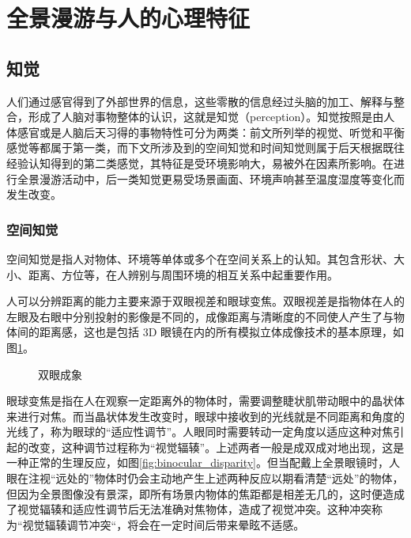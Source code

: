 \section{全景漫游与人的心理特征}

\subsection{知觉}
人们通过感官得到了外部世界的信息，这些零散的信息经过头脑的加工、解释与整合，形成了人脑对事物整体的认识，这就是知觉（perception）。知觉按照是由人体感官或是人脑后天习得的事物特性可分为两类：前文所列举的视觉、听觉和平衡感觉等都属于第一类，而下文所涉及到的空间知觉和时间知觉则属于后天根据既往经验认知得到的第二类感觉，其特征是受环境影响大，易被外在因素所影响。在进行全景漫游活动中，后一类知觉更易受场景画面、环境声响甚至温度湿度等变化而发生改变。

\subsubsection{空间知觉}
空间知觉是指人对物体、环境等单体或多个在空间关系上的认知。其包含形状、大小、距离、方位等，在人辨别与周围环境的相互关系中起重要作用。

人可以分辨距离的能力主要来源于双眼视差和眼球变焦。双眼视差是指物体在人的左眼及右眼中分别投射的影像是不同的，成像距离与清晰度的不同使人产生了与物体间的距离感，这也是包括 3D 眼镜在内的所有模拟立体成像技术的基本原理，如图\ref{fig:eyes}。

\begin{figure}[htp]
\centering
{}
\caption{双眼成象}
\label{fig:eyes}
\end{figure}

眼球变焦是指在人在观察一定距离外的物体时，需要调整睫状肌带动眼中的晶状体来进行对焦。而当晶状体发生改变时，眼球中接收到的光线就是不同距离和角度的光线了，称为眼球的“适应性调节”。人眼同时需要转动一定角度以适应这种对焦引起的改变，这种调节过程称为“视觉辐辏”。上述两者一般是成双成对地出现，这是一种正常的生理反应，如图\ref{fig:binocular_disparity}。但当配戴上全景眼镜时，人眼在注视“远处的”物体时仍会主动地产生上述两种反应以期看清楚“远处”的物体，但因为全景图像没有景深，即所有场景内物体的焦距都是相差无几的，这时便造成了视觉辐辏和适应性调节后无法准确对焦物体，造成了视觉冲突。这种冲突称为“视觉辐辏调节冲突“，将会在一定时间后带来晕眩不适感。

